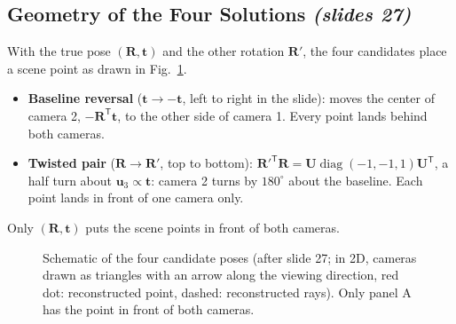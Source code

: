 \documentclass[11pt,a4paper]{article}
\newcommand{\slr}[1]{\texorpdfstring{\emph{(slides #1)}}{(slides #1)}}
\newcommand{\tr}{^{\mathsf T}}
\DeclareMathOperator{\diag}{diag}
\begin{document}
\subsection{Geometry of the Four Solutions \slr{27}}
With the true pose $(\bm R,\bm t)$ and the other rotation $\bm R'$, the four candidates place a scene point as drawn in Fig.~\ref{fig:four}.
\begin{itemize}
\item \textbf{Baseline reversal} ($\bm t\to-\bm t$, left to right in the slide): moves the center of camera 2, $-\bm R\tr\bm t$, to the other side of camera 1. Every point lands behind both cameras.
\item \textbf{Twisted pair} ($\bm R\to\bm R'$, top to bottom): $\bm R'^{\mathsf T}\bm R=\bm U\diag(-1,-1,1)\bm U\tr$, a half turn about $\bm u_3\propto\bm t$: camera 2 turns by $180^\circ$ about the baseline. Each point lands in front of one camera only.
\end{itemize}
Only $(\bm R,\bm t)$ puts the scene points in front of both cameras.

\newcommand{\camdraw}[3]{\begin{scope}[shift={(#1,#2)},rotate=#3]
 \fill[gray!25,draw=black] (0,0)--(-0.45,0.65)--(0.45,0.65)--cycle;
 \draw[-{Stealth},thick](0,0.65)--(0,1.25);\end{scope}}
\begin{figure}[H]
\centering
{}
\caption{Schematic of the four candidate poses (after slide 27; in 2D, cameras drawn as triangles with an arrow along the viewing direction, red dot: reconstructed point, dashed: reconstructed rays). Only panel A has the point in front of both cameras.}
\label{fig:four}
\end{figure}
\end{document}
